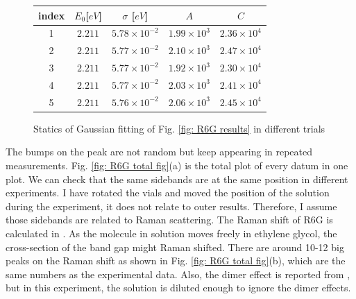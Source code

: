 \documentclass{article}
\begin{document}
\begin{figure}[H]
  \centering
  \begin{tabular}{|c| c| c|c|c|}
      index  & $E_0 $[$eV$]  & $\sigma$ [$eV$] & $A$ & $C$\\
      \hline
      1 & $2.211$ & $5.78\times 10^{-2}$ & $1.99 \times 10^3$ & $2.36 \times 10^4$\\
      2 & $2.211$ & $5.77\times 10^{-2}$ & $2.10 \times 10^3$ & $2.47 \times 10^4$\\
      3 & $2.211$ & $5.77\times 10^{-2}$ & $1.92 \times 10^3$ & $2.30 \times 10^4$\\
      4 & $2.211$ & $5.77\times 10^{-2}$ & $2.03 \times 10^3$ & $2.41 \times 10^4$\\
      5 & $2.211$ & $5.76\times 10^{-2}$ & $2.06 \times 10^3$ & $2.45 \times 10^4$\\
      
  \end{tabular}
  \caption{Statics of Gaussian fitting of Fig. \ref{fig: R6G results} in different trials}
  \label{fig: R6G optimize results}
\end{figure}

The bumps on the peak are not random but keep appearing in repeated measurements.
Fig. \ref{fig: R6G total fig}(a) is the total plot of every datum in one plot.
We can check that the same sidebands are at the same position in different experiments.
I have rotated the vials and moved the position of the solution during the experiment, it does not relate to outer results.
Therefore, I assume those sidebands are related to Raman scattering.
The Raman shift of R6G is calculated in \cite{rhodamine_HOMO_LUMO}.
As the molecule in solution moves freely in ethylene glycol, the cross-section of the band gap might Raman shifted.
There are around 10-12 big peaks on the Raman shift as shown in Fig. \ref{fig: R6G total fig}(b), which are the same numbers as the experimental data.
Also, the dimer effect is reported from \cite{Rhodamine_dimer}, but in this experiment, the solution is diluted enough to ignore the dimer effects.
\end{document}
